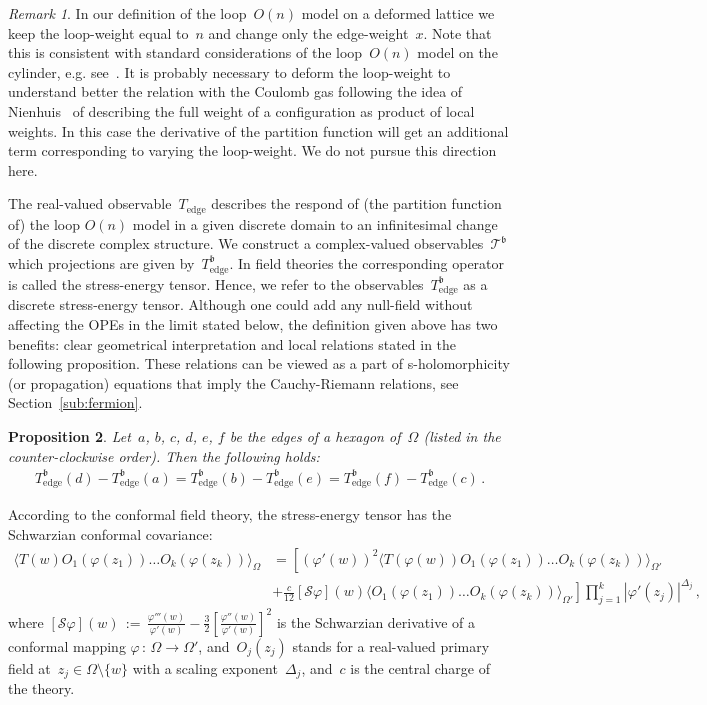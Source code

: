 \documentclass[reqno,11pt,a4paper]{amsart}
\newtheorem{proposition}{Proposition}[section]
\theoremstyle{remark}
\newtheorem{remark}[proposition]{Remark}
\newcommand{\schw}{\mathcal{S}}
\newcommand{\Te}{T_{\mathrm{edge}}}       \newcommand{\Ce}{c_{\mathrm{edge}}}
\newcommand{\Tgeom}{\mathcal{T}}
\renewcommand{\b}{\mathfrak{b}}
\begin{document}
\begin{remark}
	In our definition of the loop~$O(n)$ model on a deformed lattice we keep the loop-weight equal to~$n$
	and change only the edge-weight~$x$.
	Note that this is consistent with standard considerations of the loop~$O(n)$ model on the cylinder, e.g. see~\cite{Car13, Car96}.
	It is probably necessary to deform the loop-weight to understand better the relation with the Coulomb gas
	following the idea of Nienhuis~\cite{Nie82} of describing the full weight of a configuration as product of local weights.
	In this case the derivative of the partition function will get an additional term corresponding to varying the loop-weight.
	We do not pursue this direction here.
\end{remark}

The real-valued observable~$\Te$ describes the respond of (the partition function of) the loop $O(n)$ model in a given discrete domain to an infinitesimal change of the discrete complex structure.
We construct a complex-valued observables~$\Tgeom^\b$ which projections are given by~$\Te^\b$.
In field theories the corresponding operator is called the stress-energy tensor.
Hence, we refer to the observables~$\Te^\b$ as a discrete stress-energy tensor.
Although one could add any null-field without affecting the OPEs in the limit stated below, the definition given above has two benefits: clear geometrical interpretation and local relations stated in the following proposition. 
These relations can be viewed as a part of s-holomorphicity (or propagation) equations that imply the Cauchy-Riemann relations, see Section~\ref{sub:fermion}.

\begin{proposition}\label{prop:relation-Te}
	Let~$a$, $b$, $c$, $d$, $e$, $f$ be the edges of a hexagon of~$\Omega$ (listed in the counter-clockwise order). Then the following holds:
	\begin{align}\label{eq_relation_Te}
		\Te^{\b}(d)-\Te^{\b}(a)=\Te^{\b}(b)-\Te^{\b}(e)=\Te^{\b}(f)-\Te^{\b}(c)\,.
	\end{align}
\end{proposition}

According to the conformal field theory, the stress-energy tensor has the Schwarzian conformal covariance:
\begin{align*}
\langle T(w)O_1(\varphi(z_1))\dots O_k(\varphi(z_k))\rangle_\Omega
&=\left[ (\varphi'(w))^2\langle T(\varphi(w)) O_1(\varphi(z_1))\dots O_k(\varphi(z_k)) \rangle_{\Omega'} \right.\\
&\left.+ \tfrac{c}{12}[\schw\varphi](w) \langle O_1(\varphi(z_1))\dots O_k(\varphi(z_k))\rangle_{\Omega'}\right]
\prod_{j=1}^k |\varphi'(z_j)|^{\Delta_j}\,,
\end{align*}
where $[\schw\varphi](w)\,:=\,\frac{\varphi'''(w)}{\varphi'(w)}-\frac{3}{2}\left[\frac{\varphi''(w)}{\varphi'(w)}\right]^2$
is the Schwarzian derivative of a conformal mapping $\varphi \, : \, \Omega \to \Omega'$,
and~$O_j(z_j)$ stands for a real-valued primary field at~$z_j\in\Omega\setminus\{w\}$ with a scaling exponent~$\Delta_j$,
and~$c$ is the central charge of the theory.
\end{document}
